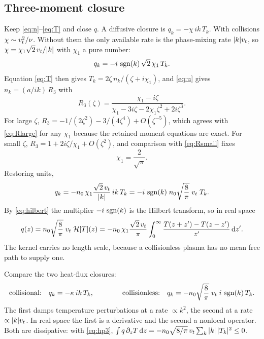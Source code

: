 \subsection{Three-moment closure}

Keep \eqref{eq:n}--\eqref{eq:T} and close $q$. A diffusive closure is
$q_k=-\chi\,ik\,T_k$. With collisions $\chi\sim v_t^2/\nu$. Without them the
only available rate is the phase-mixing rate $|k|v_t$, so
$\chi=\chi_1\sqrt2\,v_t/|k|$ with $\chi_1$ a pure number:
\begin{equation}
  q_k=-i\,\operatorname{sgn}(k)\,\sqrt2\,\chi_1\,T_k .
  \label{eq:closure3}
\end{equation}
Equation \eqref{eq:T} then gives $T_k=2\zeta\,n_k/(\zeta+i\chi_1)$, and
\eqref{eq:u} gives $n_k=(a/ik)\,R_3$ with
\begin{equation}
  R_3(\zeta)=\frac{\chi_1-i\zeta}
     {\chi_1-3i\zeta-2\chi_1\zeta^2+2i\zeta^3}.
  \label{eq:R3}
\end{equation}
For large $\zeta$, $R_3=-1/(2\zeta^2)-3/(4\zeta^4)+O(\zeta^{-5})$, which
agrees with \eqref{eq:Rlarge} for any $\chi_1$ because the retained moment
equations are exact. For small $\zeta$,
$R_3=1+2i\zeta/\chi_1+O(\zeta^2)$, and comparison with \eqref{eq:Rsmall}
fixes
\begin{equation}
  \chi_1=\frac2{\sqrt\pi}.
\end{equation}
Restoring units,
\begin{equation}
  q_k=-n_0\,\chi_1\frac{\sqrt2\,v_t}{|k|}\,ik\,T_k
     =-i\,\operatorname{sgn}(k)\;n_0\sqrt{\frac8\pi}\;v_t\;T_k .
  \label{eq:hp3}
\end{equation}
By \eqref{eq:hilbert} the multiplier $-i\,\operatorname{sgn}(k)$ is the Hilbert
transform, so in real space
\begin{equation}
  q(z)=n_0\sqrt{\frac8\pi}\;v_t\;\mathcal{H}[T](z)
      =-n_0\,\chi_1\frac{\sqrt2\,v_t}{\pi}
        \int_0^\infty\frac{T(z+z')-T(z-z')}{z'}\,\mathrm{d} z' .
  \label{eq:real3}
\end{equation}
The kernel carries no length scale, because a collisionless plasma has no
mean free path to supply one.

Compare the two heat-flux closures:
\begin{equation}
  \text{collisional:}\quad q_k=-\kappa\,ik\,T_k,
  \qquad\qquad
  \text{collisionless:}\quad
  q_k=-n_0\sqrt{\frac8\pi}\;v_t\;i\,\operatorname{sgn}(k)\,T_k .
\end{equation}
The first damps temperature perturbations at a rate $\propto k^2$, the
second at a rate $\propto|k|v_t$. In real space the first is a derivative
and the second a nonlocal operator. Both are dissipative: with
\eqref{eq:hp3},
$\int q\,\partial_zT\,\mathrm{d} z=-n_0\sqrt{8/\pi}\,v_t\sum_k|k|\,|T_k|^2\le0$.

